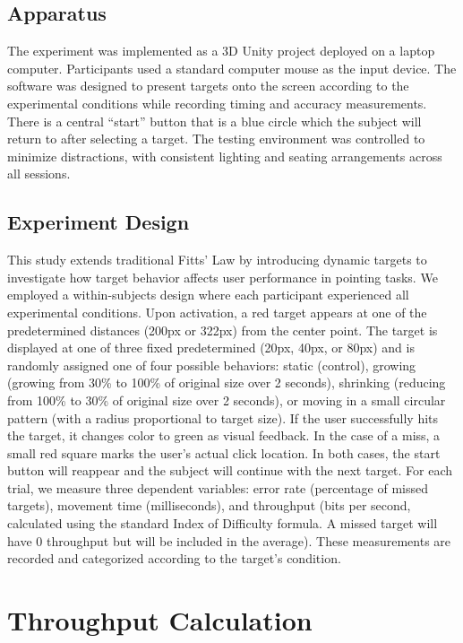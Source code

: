 \documentclass[acmlarge]{acmart}
\begin{document}
\subsection{Apparatus}
The experiment was implemented as a 3D Unity project deployed on a laptop computer. Participants used a standard computer mouse as the input device. The software was designed to present targets onto the screen according to the experimental conditions while recording timing and accuracy measurements. There is a central “start” button that is a blue circle which the subject will return to after selecting a target. The testing environment was controlled to minimize distractions, with consistent lighting and seating arrangements across all sessions.


\subsection{Experiment Design}
This study extends traditional Fitts' Law by introducing dynamic targets to investigate how target behavior affects user performance in pointing tasks. We employed a within-subjects design where each participant experienced all experimental conditions. Upon activation, a red target appears at one of the predetermined distances (200px or 322px) from the center point. The target is displayed at one of three fixed predetermined (20px, 40px, or 80px) and is randomly assigned one of four possible behaviors: static (control), growing (growing from 30\% to 100\% of original size over 2 seconds), shrinking (reducing from 100\% to 30\% of original size over 2 seconds), or moving in a small circular pattern (with a radius proportional to target size). If the user successfully hits the target, it changes color to green as visual feedback. In the case of a miss, a small red square marks the user's actual click location. In both cases, the start button will reappear and the subject will continue with the next target. For each trial, we measure three dependent variables: error rate (percentage of missed targets), movement time (milliseconds), and throughput (bits per second, calculated using the standard Index of Difficulty formula. A missed target will have 0 throughput but will be included in the average). These measurements are recorded and categorized according to the target's condition.

\section{Throughput Calculation}
\end{document}
